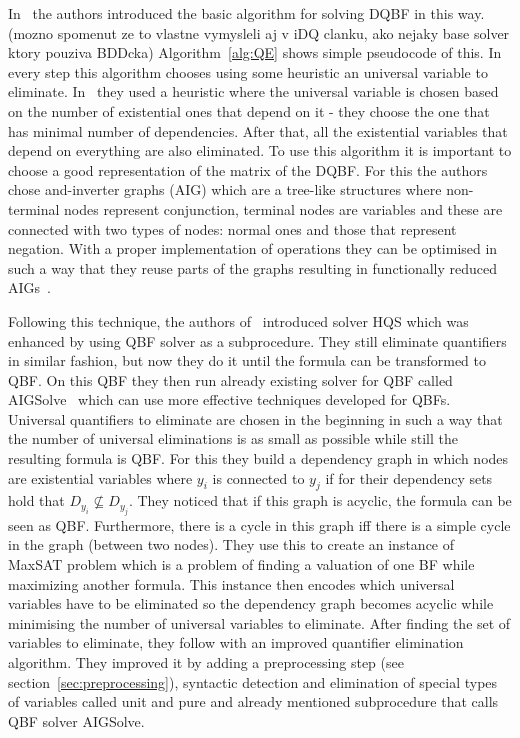 \documentclass[
  digital, %
  twoside, %
  table,   %
  nolof,     %
  nolot,     %
]{fithesis3}
\theoremstyle{definition}
\theoremstyle{remark}
\begin{document}
In~\cite{HQSsimpleAlg} the authors introduced the basic algorithm for solving DQBF in this way. (mozno spomenut ze to vlastne vymysleli aj v iDQ clanku, ako nejaky base solver ktory pouziva BDDcka) Algorithm~\ref{alg:QE} shows simple pseudocode of this. In every step this algorithm chooses using some heuristic an universal variable to eliminate. In~\cite{HQSsimpleAlg} they used a heuristic where the universal variable is chosen based on the number of existential ones that depend on it - they choose the one that has minimal number of dependencies. After that, all the existential variables that depend on everything are also eliminated. To use this algorithm it is important to choose a good representation of the matrix of the DQBF. For this the authors chose and-inverter graphs (AIG) which are a tree-like structures where non-terminal nodes represent conjunction, terminal nodes are variables and these are connected with two types of nodes: normal ones and those that represent negation. With a proper implementation of operations they can be optimised in such a way that they reuse parts of the graphs resulting in functionally reduced AIGs~\cite{FRAIGs}.


Following this technique,  the authors of~\cite{HQSquantifierElimination} introduced solver HQS which was enhanced by using QBF solver as a subprocedure. They still eliminate quantifiers in similar fashion, but now they do it until the formula can be transformed to QBF. On this QBF they then run already existing solver for QBF called AIGSolve~\cite{AIGSolve} which can use more effective techniques developed for QBFs. Universal quantifiers to eliminate are chosen in the beginning in such a way that the number of universal eliminations is as small as possible while still the resulting formula is QBF. For this they build a dependency graph in which nodes are existential variables where $y_i$ is connected to $y_j$ if for their dependency sets hold that $D_{y_i} \not\subseteq D_{y_j}$. They noticed that if this graph is acyclic, the formula can be seen as QBF. Furthermore, there is a cycle in this graph iff there is a simple cycle in the graph (between two nodes). They use this to create an instance of MaxSAT problem which is a problem of finding a valuation of one BF while maximizing another formula. This instance then encodes which universal variables have to be eliminated so the dependency graph becomes acyclic while minimising the number of universal variables to eliminate. After finding the set of variables to eliminate, they follow with an improved quantifier elimination algorithm. They improved it by adding a preprocessing step (see section~\ref{sec:preprocessing}), syntactic detection and elimination of special types of variables called unit and pure and already mentioned subprocedure that calls QBF solver AIGSolve.
\end{document}
